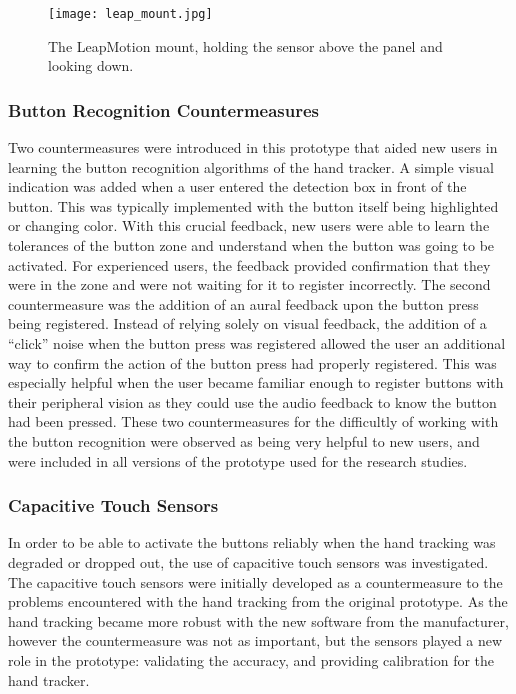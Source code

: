 \begin{figure}
    \centering
    \texttt{[image: leap\_mount.jpg]}
    \caption{The LeapMotion mount, holding the sensor above the panel and looking down.}
    \label{fig:proto_leap_mount}
\end{figure}

\subsubsection{Button Recognition Countermeasures}

Two countermeasures were introduced in this prototype that aided new users in learning the button recognition algorithms of the hand tracker.
A simple visual indication was added when a user entered the detection box in front of the button.
This was typically implemented with the button itself being highlighted or changing color.
With this crucial feedback, new users were able to learn the tolerances of the button zone and understand when the button was going to be activated.
For experienced users, the feedback provided confirmation that they were in the zone and were not waiting for it to register incorrectly.
The second countermeasure was the addition of an aural feedback upon the button press being registered.
Instead of relying solely on visual feedback, the addition of a ``click'' noise when the button press was registered allowed the user an additional way to confirm the action of the button press had properly registered.
This was especially helpful when the user became familiar enough to register buttons with their peripheral vision as they could use the audio feedback to know the button had been pressed.
These two countermeasures for the difficultly of working with the button recognition were observed as being very helpful to new users, and were included in all versions of the prototype used for the research studies.

\subsubsection{Capacitive Touch Sensors}
\label{sec:proto_cap_touch}

In order to be able to activate the buttons reliably when the hand tracking was degraded or dropped out, the use of capacitive touch sensors was investigated.
The capacitive touch sensors were initially developed as a countermeasure to the problems encountered with the hand tracking from the original prototype.
As the hand tracking became more robust with the new software from the manufacturer, however the countermeasure was not as important, but the sensors played a new role in the prototype: validating the accuracy, and providing calibration for the hand tracker.

